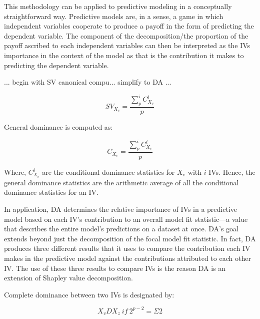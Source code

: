 \documentclass[ShortAfour,times,sageapa]{sagej}
\begin{document}
	This methodology can be applied to predictive modeling in a conceptually straightforward way.
	Predictive models are, in a sense, a game in which independent variables cooperate to produce a payoff in the form of predicting the dependent variable. 
	The component of the decomposition/the proportion of the payoff ascribed to each independent variables can then be interpreted as the IVs importance in the context of the model as that is the contribution it makes to predicting the dependent variable.
	
	... begin with SV canonical compu... simplify to DA ...
	
	\begin{equation}
		SV_{X_v} = \frac{\sum_{p}^{i} C^{i}_{X_v}}{p}
	\end{equation}
	
	
	General dominance is computed as:
	
	\begin{equation}
		C_{X_v} = \frac{\sum_{p}^{i} C^{i}_{X_v}}{p}
	\end{equation}
	
	Where, $C^{i}_{X_v}$ are the conditional dominance statistics for $X_v$ with $i$ IVs. 
	Hence, the general dominance statistics are the arithmetic average of all the conditional dominance statistics for an IV.
	
	In application, DA determines the relative importance of IVs in a predictive model based on each IV’s contribution to an overall model fit statistic—a value that describes the entire model’s predictions on a dataset at once. 
	DA’s goal extends beyond just the decomposition of the focal model fit statistic. 
	In fact, DA produces three different results that it uses to compare the contribution each IV makes in the predictive model against the contributions attributed to each other IV. 
	The use of these three results to compare IVs is the reason DA is an extension of Shapley value decomposition.
	
	Complete dominance between two IVs is designated by:
	
	\begin{equation}
		X_{v}DX_{z}\ if\ 2^{p-2} = \Sigma{2} %
	\end{equation}
	
\end{document}
